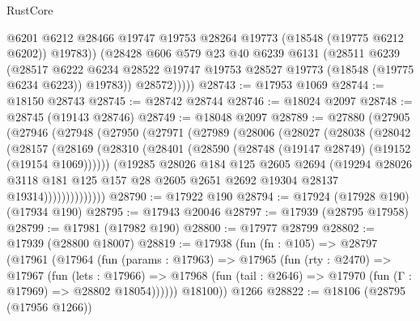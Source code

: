 \begin{lexlean}{RustCore}
\begin{coremodule}
                @6201
                @6212
                @28466
                @19747
                @19753
                @28264
                @19773
                (@18548 (@19775 @6212 @6202))
                @19783))
            (@28428
              @606
              @579
              @23
              @40
              @6239
              @6131
              (@28511
                @6239
                (@28517
                  @6222
                  @6234
                  @28522
                  @19747
                  @19753
                  @28527
                  @19773
                  (@18548 (@19775 @6234 @6223))
                  @19783))
              @28572)))))
@28743 := @17953 @1069
@28744 := @18150 @28743
@28745 := @28742 @28744
@28746 := @18024 @2097
@28748 := @28745 (@19143 @28746)
@28749 := @18048 @2097
@28789 := @27880
    (@27905
      (@27946
        (@27948
          (@27950
            (@27971
              (@27989
                (@28006
                  (@28027
                    (@28038
                      (@28042
                        (@28157
                          (@28169
                            (@28310
                              (@28401 (@28590 (@28748 (@19147 @28749) (@19152 (@19154 @1069))))))
                            (@19285
                              @28026
                              @184
                              @125
                              @2605
                              @2694
                              (@19294
                                @28026
                                @3118
                                @181
                                @125
                                @157
                                @28
                                @2605
                                @2651
                                @2692
                                @19304
                                @28137
                                @19314))))))))))))))
@28790 := @17922 @190
@28794 := @17924 (@17928 @190) (@17934 @190)
@28795 := @17943 @20046
@28797 := @17939 (@28795 @17958)
@28799 := @17981 (@17982 @190)
@28800 := @17977 @28799
@28802 := @17939 (@28800 @18007)
@28819 := @17938
    (fun (fn : @105) =>
    @28797
      (@17961
        (@17964
          (fun (params : @17963) =>
          @17965
            (fun (rty : @2470) =>
            @17967
              (fun (lets : @17966) =>
              @17968 (fun (tail : @2646) => @17970 (fun (Γ : @17969) => @28802 @18054))))))
        @18100))
    @1266
@28822 := @18106 (@28795 (@17956 @1266))

\end{coremodule}
\end{lexlean}
